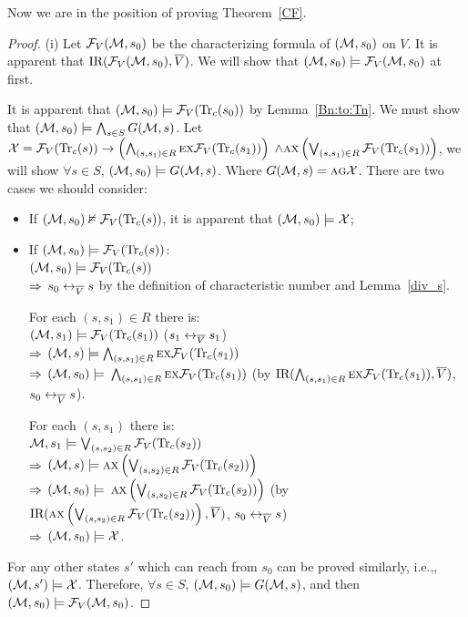 \documentclass[letterpaper]{article} %
\begin{document}
Now we are in the position of proving Theorem~\ref{CF}.\\
\begin{proof}
(i) Let ${\cal F}_V({\cal M}, s_0)$ be the characterizing formula of $({\cal M}, s_0)$ on $V$.
It is apparent that $\textrm{IR}({\cal F}_V({\cal M}, s_0), \overline V)$. We will show that $({\cal M}, s_0) \models {\cal F}_V({\cal M}, s_0)$ at first.

It is apparent that $({\cal M}, s_0) \models {\cal F}_V(\textrm{Tr}_c(s_0))$ by Lemma~\ref{Bn:to:Tn}.
We must show that $({\cal M}, s_0) \models \bigwedge_{s\in S} G({\cal M}, s)$.
Let ${\cal X} = {\cal F}_V(\textrm{Tr}_c(s)) \rightarrow \left(\bigwedge_{(s,s_1) \in R} \textsc{e} \textsc{x} {\cal F}_V(\textrm{Tr}_c(s_1))\right)$ $\wedge \textsc{a} \textsc{x} \left(\bigvee_{(s,s_1) \in R} {\cal F}_V(\textrm{Tr}_c(s_1))\right)$, we will show $\forall s\in S$, $({\cal M}, s_0) \models G({\cal M}, s)$. Where $G({\cal M}, s)=\textsc{a}\textsc{g} \cal X$.
There are two cases we should consider:
\begin{itemize}
  \item  If $({\cal M}, s_0) \nvDash {\cal F}_V(\textrm{Tr}_c(s))$, it is apparent that $({\cal M}, s_0) \models {\cal X}$;
  \item  If $({\cal M}, s_0) \models {\cal F}_V(\textrm{Tr}_c(s))$:\\
         $({\cal M}, s_0) \models {\cal F}_V(\textrm{Tr}_c(s))$\\
        $\Rightarrow$  $s_0 \leftrightarrow_{\overline V} s$ by the definition of characteristic number and Lemma~\ref{div_s}.

        For each $(s, s_1)\in R$ there is:\\
         $({\cal M}, s_1) \models {\cal F}_V(\textrm{Tr}_c(s_1))$  \hfill  ($s_1 \leftrightarrow_{\overline V} s_1$)\\
        $\Rightarrow$ $({\cal M}, s) \models \bigwedge_{(s,s_1)\in R}\textsc{e} \textsc{x} {\cal F}_V(\textrm{Tr}_c(s_1))$\\
        $\Rightarrow$ $({\cal M}, s_0) \models$ $\bigwedge_{(s,s_1)\in R}\textsc{e} \textsc{x} {\cal F}_V(\textrm{Tr}_c(s_1))$    \qquad  (by $\textrm{IR}(\bigwedge_{(s,s_1)\in R}\textsc{e} \textsc{x} {\cal F}_V(\textrm{Tr}_c(s_1)), \overline V)$, $s_0 \leftrightarrow_{\overline V} s$).

         For each $(s, s_1)$ there is:\\
          ${\cal M}, s_1 \models \bigvee_{(s, s_2)\in R}{\cal F}_V(\textrm{Tr}_c(s_2))$\\
        $\Rightarrow$ $({\cal M}, s) \models \textsc{a} \textsc{x} \left( \bigvee_{(s, s_2)\in R} {\cal F}_V(\textrm{Tr}_c(s_2)) \right)$ \\
        $\Rightarrow$ $({\cal M}, s_0) \models$  $\textsc{a} \textsc{x} \left( \bigvee_{(s, s_2)\in R} {\cal F}_V(\textrm{Tr}_c(s_2)) \right)$   \qquad  (by $\textrm{IR}(\textsc{a} \textsc{x} \left( \bigvee_{(s, s_2)\in R} {\cal F}_V(\textrm{Tr}_c(s_2)) \right), \overline V)$, $s_0 \leftrightarrow_{\overline V} s$)\\
        $\Rightarrow$ $({\cal M}, s_0) \models {\cal X}$.\\
\end{itemize}
For any other states $s'$ which can reach from $s_0$ can be proved similarly, i.e.,, $({\cal M},s')\models \cal X$.
Therefore, $\forall s\in S$, $({\cal M}, s_0) \models G({\cal M}, s)$, and then $({\cal M}, s_0) \models {\cal F}_V({\cal M}, s_0)$.



\end{proof}
\end{document}
